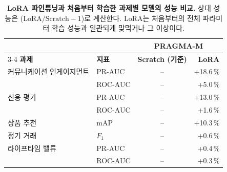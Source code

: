 \begin{table}[t]
\centering
\begin{tabular}{llcr}
& & \multicolumn{2}{c}{\textbf{PRAGMA-M}} \\
\cmidrule(lr){3-4}
\textbf{과제} & \textbf{지표} & \textbf{Scratch (기준)} & \textbf{LoRA} \\
\midrule
커뮤니케이션 인게이지먼트 & PR-AUC          & --                     &  +18.6\,\%               \\
                         & ROC-AUC         & --                     &  +5.0\,\%               \\
\addlinespace
신용 평가           & PR-AUC          & --                     & +13.0\,\%               \\
                         & ROC-AUC         & --                     &  +1.6\,\%               \\
\addlinespace
상품 추천   & mAP             & --                     &  +10.3\,\%             \\
\addlinespace
정기 거래   & $F_\text{1}$    & --                     & +0.6\,\%              \\
\addlinespace
라이프타임 밸류           & PR-AUC          & --                     &  +0.4\,\%               \\
                         & ROC-AUC         & --                     &  +0.3\,\%               \\
\end{tabular}
\caption{\textbf{LoRA 파인튜닝과 처음부터 학습한 과제별 모델의 성능 비교.}
상대 성능은 ($\text{LoRA} / \text{Scratch} - 1$)로 계산한다.
LoRA는 처음부터의 전체 파라미터 학습 성능과 일관되게 맞먹거나 그 이상이다.}
\label{tab:scratch_vs_lora}
\end{table}
